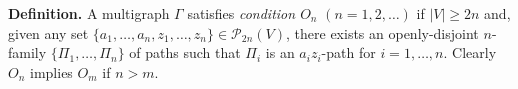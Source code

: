 \textbf{Definition.} A multigraph $\Gamma$ satisfies \textit{condition $O_n$} $(n = 1, 2, \ldots)$ if $|V| \geq 2n$ and, given any set $\{a_1, \ldots, a_n, z_1, \ldots, z_n\} \in \mathcal{P}_{2n}(V)$, there exists an openly-disjoint $n$-family $\{\Pi_1, \ldots, \Pi_n\}$ of paths such that $\Pi_i$ is an $a_iz_i$-path for $i = 1, \ldots, n$. Clearly $O_n$ implies $O_m$ if $n > m$.
